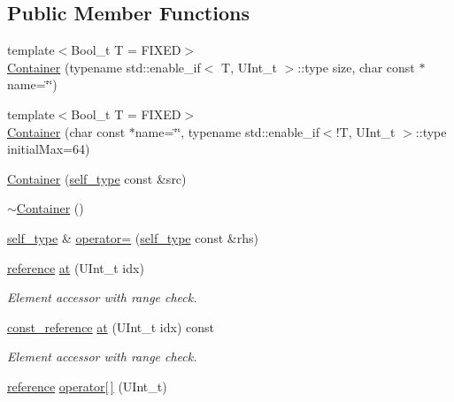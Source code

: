 \subsection*{Public Member Functions}
\begin{DoxyCompactItemize}
\item 
{\footnotesize template$<$Bool\-\_\-t T = F\-I\-X\-E\-D$>$ }\\\hyperlink{classpanda_1_1Container_a7eef12120bdef491b7ecc1195d8a6768}{Container} (typename std\-::enable\-\_\-if$<$ T, U\-Int\-\_\-t $>$\-::type size, char const $\ast$name=\char`\"{}\char`\"{})
\item 
{\footnotesize template$<$Bool\-\_\-t T = F\-I\-X\-E\-D$>$ }\\\hyperlink{classpanda_1_1Container_aec5b4f7c38e74c81142e4f6de5a5bc5a}{Container} (char const $\ast$name=\char`\"{}\char`\"{}, typename std\-::enable\-\_\-if$<$!T, U\-Int\-\_\-t $>$\-::type initial\-Max=64)
\item 
\hyperlink{classpanda_1_1Container_aec587dc1a3991463ce002ee9cb82cb08}{Container} (\hyperlink{classpanda_1_1Container_a3c67ee697decfd9da487194415cce212}{self\-\_\-type} const \&src)
\item 
\hyperlink{classpanda_1_1Container_a6f0fc0b59a31bac1ec9a7f9584299545}{$\sim$\-Container} ()
\item 
\hyperlink{classpanda_1_1Container_a3c67ee697decfd9da487194415cce212}{self\-\_\-type} \& \hyperlink{classpanda_1_1Container_a12c1ec82df87e7bb377788c76ba07891}{operator=} (\hyperlink{classpanda_1_1Container_a3c67ee697decfd9da487194415cce212}{self\-\_\-type} const \&rhs)
\item 
\hyperlink{classpanda_1_1Container_a3b6330ccf0d9ed33975d098520f103cb}{reference} \hyperlink{classpanda_1_1Container_adb0f3401d8660fcfb66a7f6738b03871}{at} (U\-Int\-\_\-t idx)
\begin{DoxyCompactList}\small\item\em Element accessor with range check. \end{DoxyCompactList}\item 
\hyperlink{classpanda_1_1Container_a336135bd19b8b176006d8e7413c8c8f1}{const\-\_\-reference} \hyperlink{classpanda_1_1Container_a772a71f6fba739d853bb904ca5a5fa9a}{at} (U\-Int\-\_\-t idx) const 
\begin{DoxyCompactList}\small\item\em Element accessor with range check. \end{DoxyCompactList}\item 
\hyperlink{classpanda_1_1Container_a3b6330ccf0d9ed33975d098520f103cb}{reference} \hyperlink{classpanda_1_1Container_a249fc903c76cb3bbe91983d6d99c474f}{operator\mbox{[}$\,$\mbox{]}} (U\-Int\-\_\-t)

\end{DoxyCompactItemize}
